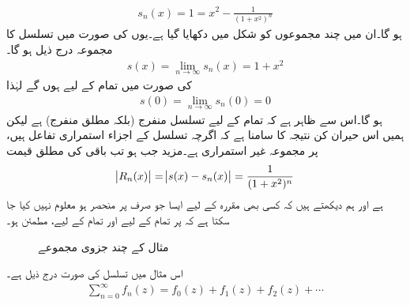 \begin{align*}
s_n(x)=1=x^2-\frac{1}{(1+x^2)^n}
\end{align*}
ہو گا۔ان میں چند مجموعوں کو شکل  میں دکھایا گیا ہے۔یوں  کی صورت میں تسلسل کا مجموعہ درج ذیل ہو گا۔
\begin{align*}
s(x)=\lim_{n\to \infty} s_n(x)=1+x^2
\end{align*}
 کی صورت میں تمام  کے لیے  ہوں گے لہٰذا 
\begin{align*}
s(0)=\lim_{n\to \infty} s_n(0)=0
\end{align*}
ہو گا۔اس سے ظاہر ہے کہ تمام  کے لیے  تسلسل منفرج  (بلکہ مطلق منفرج) ہے لیکن ہمیں اس حیران کن نتیجہ کا سامنا ہے کہ اگرچہ تسلسل کے اجزاء استمراری تفاعل ہیں،  پر مجموعہ غیر استمراری ہے۔مزید جب  ہو تب باقی کی مطلق قیمت
\begin{align*}
\abs{R_n(x)}=\abs{s(x)-s_n(x)}=\frac{1}{(1+x^2)^n}
\end{align*} 
ہے اور ہم دیکھتے ہیں کہ کسی بھی مقررہ  کے لیے ایسا  جو صرف  پر منحصر ہو معلوم نہیں کیا جا سکتا ہے کہ  پر تمام  کے لیے  اور تمام   کے لیے،    مطمئن  ہو۔
\begin{figure}
\centering
{}
\caption{مثال  کے چند جزوی مجموعے}
\label{شکل_مثال_ٹیلر_عجیب_تسلسل}
\end{figure}
اس مثال میں تسلسل کی صورت درج ذیل ہے۔
\begin{align}\label{مساوات_ٹیلر_عمومی_اجزاء_الف}
\sum\limits_{n=0}^{\infty} f_n(z)=f_0(z)+f_1(z)+f_2(z)+\cdots
\end{align}

